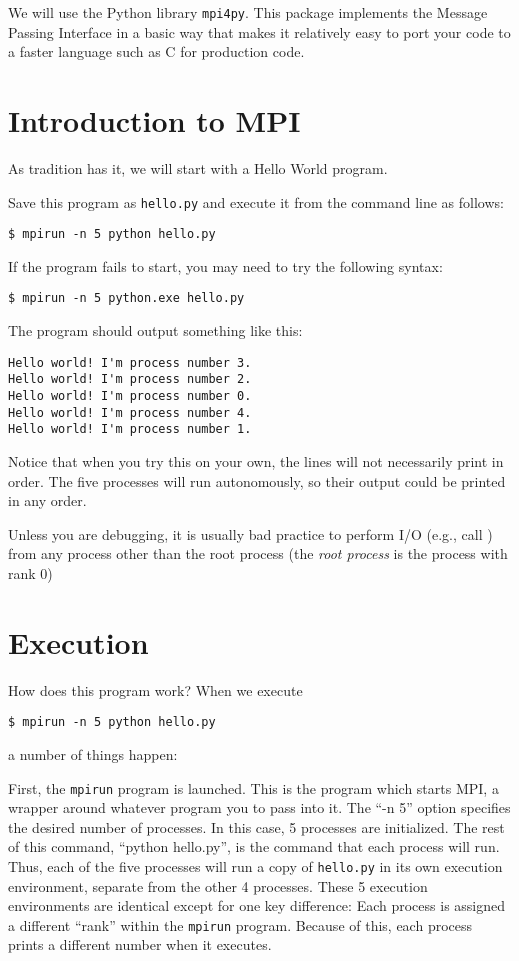 We will use the Python library \texttt{mpi4py}. This package implements the Message Passing Interface in a basic way that makes it relatively easy to port your code to a faster language such as C for production code.

\section*{Introduction to MPI}
As tradition has it, we will start with a Hello World program.

Save this program as \texttt{hello.py} and execute it from the command line as follows:
\begin{lstlisting}[style=ShellInput]
$ mpirun -n 5 python hello.py
\end{lstlisting}
\begin{info}
If the program fails to start, you may need to try the following syntax:
\begin{lstlisting}[style=ShellInput]
$ mpirun -n 5 python.exe hello.py
\end{lstlisting}
\end{info}
The program should output something like this:
\begin{lstlisting}[style=ShellOutput]
Hello world! I'm process number 3.
Hello world! I'm process number 2.
Hello world! I'm process number 0.
Hello world! I'm process number 4.
Hello world! I'm process number 1.
\end{lstlisting}
Notice that when you try this on your own, the lines will not necessarily print in order.
The five processes will run autonomously, so their output could be printed in any order.

\begin{warn}
Unless you are debugging, it is usually bad practice to perform I/O (e.g., call ) from any process
other than the root process (the \emph{root process} is the process with rank 0)
\end{warn}

\section*{Execution}
How does this program work? When we execute
\begin{lstlisting}[style=ShellInput]
$ mpirun -n 5 python hello.py
\end{lstlisting}
a number of things happen:

First, the \texttt{mpirun} program is launched.
This is the program which starts MPI, a wrapper around whatever program you to pass into it.
The ``-n 5'' option specifies the desired number of processes.
In this case, 5 processes are initialized.
The rest of this command, ``python hello.py'', is the command that each process will run.
Thus, each of the five processes will run a copy of \texttt{hello.py} in its own execution environment, separate from the other 4 processes.
These 5 execution environments are identical except for one key difference: Each process is assigned a different ``rank'' within the \texttt{mpirun} program.
Because of this, each process prints a different number when it executes.

